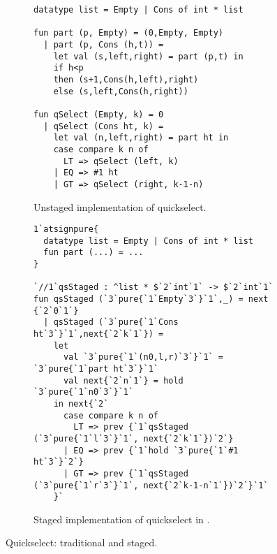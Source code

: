 
\begin{figure*}
\begin{subfigure}{0.5\textwidth}
\begin{lstlisting} 
datatype list = Empty | Cons of int * list

fun part (p, Empty) = (0,Empty, Empty) 
  | part (p, Cons (h,t)) = 
    let val (s,left,right) = part (p,t) in 
    if h<p 
    then (s+1,Cons(h,left),right) 
    else (s,left,Cons(h,right))

fun qSelect (Empty, k) = 0
  | qSelect (Cons ht, k) =
    let val (n,left,right) = part ht in
    case compare k n of
      LT => qSelect (left, k)
    | EQ => #1 ht
    | GT => qSelect (right, k-1-n)
\end{lstlisting}
\caption{Unstaged implementation of quickselect.}
\label{fig:qs-unstaged}
\end{subfigure}
\begin{subfigure}{0.5\textwidth}
\begin{lstlisting} 
1`atsignpure{
  datatype list = Empty | Cons of int * list
  fun part (...) = ...
} 

`//1`qsStaged : ^list * $`2`int`1` -> $`2`int`1`
fun qsStaged (`3`pure{`1`Empty`3`}`1`,_) = next {`2`0`1`}
  | qsStaged (`3`pure{`1`Cons ht`3`}`1`,next{`2`k`1`}) = 
    let 
      val `3`pure{`1`(n0,l,r)`3`}`1` = `3`pure{`1`part ht`3`}`1`
      val next{`2`n`1`} = hold `3`pure{`1`n0`3`}`1`
    in next{`2`
      case compare k n of
        LT => prev {`1`qsStaged (`3`pure{`1`l`3`}`1`, next{`2`k`1`})`2`}
      | EQ => prev {`1`hold `3`pure{`1`#1 ht`3`}`2`}
      | GT => prev {`1`qsStaged (`3`pure{`1`r`3`}`1`, next{`2`k-1-n`1`})`2`}`1`
    }`
\end{lstlisting}
\caption{Staged implementation of quickselect in \lang.}
\label{fig:qs-staged}
\end{subfigure}
\caption{Quickselect: traditional and staged.}
\end{figure*}


